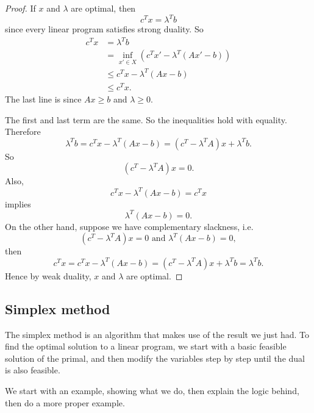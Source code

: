 \documentclass[a4paper]{article}
\begin{document}
\begin{proof}
  If $x$ and $\lambda$ are optimal, then
  \[
    c^Tx = \lambda^T b
  \]
  since every linear program satisfies strong duality. So
  \begin{align*}
    c^Tx &= \lambda^T b\\
    &= \inf_{x'\in X} (c^T x' - \lambda^T(Ax' - b))\\
    &\leq c^T x - \lambda^T (Ax - b)\\
    &\leq c^T x.
  \end{align*}
  The last line is since $Ax \geq b$ and $\lambda\geq 0$.

  The first and last term are the same. So the inequalities hold with equality. Therefore
  \[
    \lambda^T b = c^Tx - \lambda^T (Ax - b) = (c^T - \lambda^TA)x + \lambda^Tb.
  \]
  So
  \[
    (c^T - \lambda^TA)x = 0.
  \]
  Also,
  \[
    c^Tx - \lambda^T(Ax - b) = c^Tx
  \]
  implies
  \[
    \lambda^T(Ax - b) = 0.
  \]
  On the other hand, suppose we have complementary slackness, i.e.
  \[
    (c^T - \lambda^T A)x = 0\text{ and }\lambda^T(Ax - b) = 0,
  \]
  then
  \[
    c^Tx = c^Tx - \lambda^T(Ax - b) = (c^T - \lambda^T A)x + \lambda^T b = \lambda^Tb.
  \]
  Hence by weak duality, $x$ and $\lambda$ are optimal.
\end{proof}
\subsection{Simplex method}
The simplex method is an algorithm that makes use of the result we just had. To find the optimal solution to a linear program, we start with a basic feasible solution of the primal, and then modify the variables step by step until the dual is also feasible.

We start with an example, showing what we do, then explain the logic behind, then do a more proper example.
\end{document}

